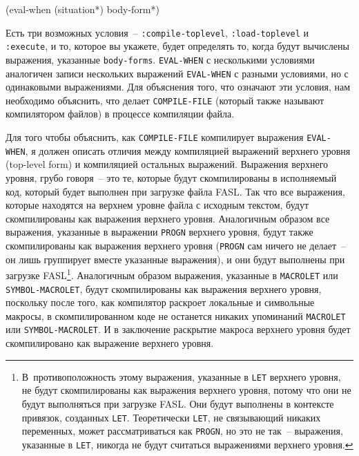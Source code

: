 \begin{myverb}
(eval-when (situation*)
  body-form*)
\end{myverb}

Есть три возможных условия~-- \lstinline{:compile-toplevel}, \lstinline{:load-toplevel}
и \lstinline{:execute}, и то, которое вы укажете, будет определять то, когда будут вычислены
выражения, указанные \lstinline{body-forms}.  \lstinline{EVAL-WHEN} с несколькими условиями
аналогичен записи нескольких выражений \lstinline{EVAL-WHEN} с разными условиями, но с
одинаковыми выражениями.  Для объяснения того, что означают эти условия, нам необходимо
объяснить, что делает \lstinline{COMPILE-FILE} (который также называют компилятором файлов) в
процессе компиляции файла.

Для того чтобы объяснить, как \lstinline{COMPILE-FILE} компилирует выражения
\lstinline{EVAL-WHEN}, я должен описать отличия между компиляцией выражений верхнего
уровня (top-level form) и компиляцией остальных выражений.  Выражения верхнего уровня,
грубо говоря~-- это те, которые будут скомпилированы в исполняемый код, который будет
выполнен при загрузке файла FASL.  Так что все выражения, которые находятся на верхнем
уровне файла с исходным текстом, будут скомпилированы как выражения верхнего
уровня. Аналогичным образом все выражения, указанные в выражении \lstinline{PROGN}
верхнего уровня, будут также скомпилированы как выражения верхнего уровня
(\lstinline{PROGN} сам ничего не делает~-- он лишь группирует вместе указанные выражения),
и они будут выполнены при загрузке FASL\footnote{В~противоположность этому выражения,
  указанные в \lstinline{LET} верхнего уровня, не будут скомпилированы как выражения
  верхнего уровня, потому что они не будут выполняться при загрузке FASL.  Они будут
  выполнены в контексте привязок, созданных \lstinline{LET}. Теоретически \lstinline{LET},
  не связывающий никаких переменных, может рассматриваться как \lstinline{PROGN}, но это не
  так~-- выражения, указанные в \lstinline{LET}, никогда не будут считаться выражениями
  верхнего уровня.}\hspace{\footnotenegspace}.  Аналогичным образом выражения, указанные в \lstinline{MACROLET} или
\lstinline{SYMBOL-MACROLET}, будут скомпилированы как выражения верхнего уровня, поскольку
после того, как компилятор раскроет локальные и символьные макросы, в скомпилированном
коде не останется никаких упоминаний \lstinline{MACROLET} или \lstinline{SYMBOL-MACROLET}.
И в заключение раскрытие макроса верхнего уровня будет скомпилировано как выражение
верхнего уровня.

